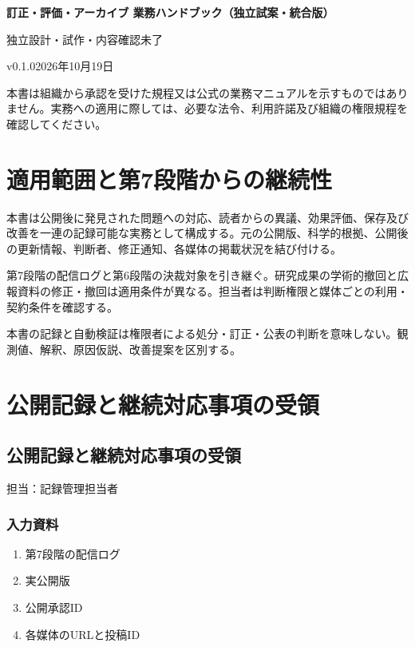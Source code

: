 \documentclass[a4paper,11pt]{article}
\begin{document}
\begin{center}
{\Large\bfseries 訂正・評価・アーカイブ 業務ハンドブック（独立試案・統合版）}\par\medskip
{\small 独立設計・試作・内容確認未了}\par
{\small v0.1.0\quad 2026年10月19日}\par
\end{center}
\vspace{6mm}
\noindent 本書は組織から承認を受けた規程又は公式の業務マニュアルを示すものではありません。実務への適用に際しては、必要な法令、利用許諾及び組織の権限規程を確認してください。\par
\tableofcontents
\clearpage
\section{適用範囲と第7段階からの継続性}
\par 本書は公開後に発見された問題への対応、読者からの異議、効果評価、保存及び改善を一連の記録可能な実務として構成する。元の公開版、科学的根拠、公開後の更新情報、判断者、修正通知、各媒体の掲載状況を結び付ける。\par\medskip
\par 第7段階の配信ログと第6段階の決裁対象を引き継ぐ。研究成果の学術的撤回と広報資料の修正・撤回は適用条件が異なる。担当者は判断権限と媒体ごとの利用・契約条件を確認する。\par\medskip
\par 本書の記録と自動検証は権限者による処分・訂正・公表の判断を意味しない。観測値、解釈、原因仮説、改善提案を区別する。\par\medskip
\section{公開記録と継続対応事項の受領}
\subsection{公開記録と継続対応事項の受領}
\par 担当：記録管理担当者\par\medskip
\subsubsection*{入力資料}
\begin{enumerate}[leftmargin=2em,itemsep=0.35em]
\item 第7段階の配信ログ
\item 実公開版
\item 公開承認ID
\item 各媒体のURLと投稿ID
\end{enumerate}
\end{document}
